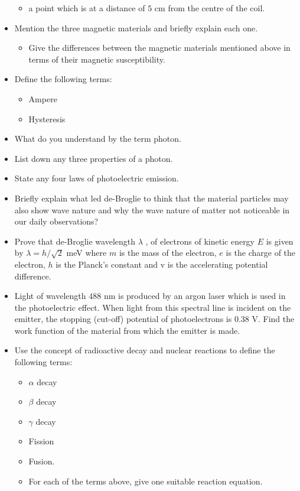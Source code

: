 \documentclass{article}
\begin{document}
\begin{itemize}
\begin{itemize}
\item a point which is at a distance of $ 5$ cm from the centre of the coil. 
\end{itemize}
\item Mention the three magnetic materials and briefly explain each one. 
 \begin{itemize}
\item Give the differences between the magnetic materials mentioned above in terms of their magnetic susceptibility. 
\end{itemize}
\item Define the following terms:
 \begin{itemize}
\item Ampere 
\item Hysteresis 
\end{itemize}
\item What do you understand by the term photon. 
\item List down any three properties of a photon. 
\item State any four laws of photoelectric emission. 
\item Briefly explain what led de-Broglie to think that the material particles may also show wave nature and why the wave nature of matter not noticeable in our daily observations? 
\item Prove that de-Broglie wavelength $ \lambda $ , of electrons of kinetic energy $ E$ is given by $ \lambda = h/ \sqrt{2}$ meV  where $ m$ is the mass of the electron, $ e$ is the charge of the electron, $ h$ is the Planck’s constant and v is the accelerating potential difference. 
\item Light of wavelength $ 488$ nm is produced by an argon laser which is used in the photoelectric effect. When light from this spectral line is incident on the emitter, the stopping (cut-off) potential of photoelectrons is $ 0.38$ V. Find the work function of the material from which the emitter is made. 
\item Use the concept of radioactive decay and nuclear reactions to define the following terms:
 \begin{itemize}
\item $ \alpha $ decay
\item $ \beta$ decay
\item $ \gamma $ decay
\item Fission
\item Fusion.
\item For each of the terms above, give one suitable reaction equation. 

\end{itemize}
\end{itemize}
\end{document}
